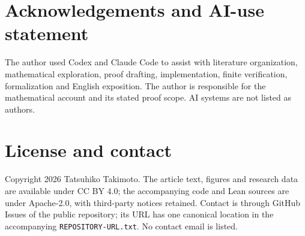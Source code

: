 \documentclass[11pt]{amsart}
\newcommand{\record}[1]{\nolinkurl{#1}}
\theoremstyle{definition}\newtheorem{definition}{Definition}
\begin{document}
\section*{Acknowledgements and AI-use statement}
The author used Codex and Claude Code to assist with literature
organization, mathematical exploration, proof drafting, implementation,
finite verification, formalization and English exposition. The author
is responsible for the mathematical account and its stated proof
scope. AI systems are not listed as authors.

\section*{License and contact}
Copyright 2026 Tatsuhiko Takimoto. The article text, figures and research
data are available under CC BY 4.0; the accompanying code and Lean
sources are under Apache-2.0, with third-party notices retained.
Contact is through GitHub Issues of the public repository; its URL
has one canonical location in the accompanying
\record{REPOSITORY-URL.txt}. No contact email is listed.
\end{document}
